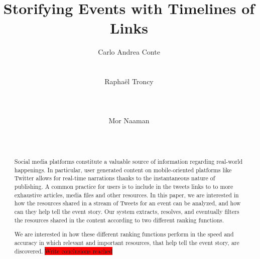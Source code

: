 \documentclass{sig-alternate}
\newcommand{\todo}[1]{\colorbox{red}{#1}}
\begin{document}
\title{Storifying Events with Timelines of Links}

\author{
\alignauthor Carlo Andrea Conte\\
	\\
    \\
\alignauthor Rapha\"el Troncy\\
	\\
	\\
		\\
\alignauthor Mor Naaman\\
    \\
    \\
}

\maketitle


\begin{abstract}

Social media platforms constitute a valuable source of information regarding real-world happenings. In particular, user generated content on mobile-oriented platforms like Twitter allows for real-time narrations thanks to the instantaneous nature of publishing. A common practice for users is to include in the tweets links to to more exhaustive articles, media files and other resources. In this paper, we are interested in how the resources shared in a stream of Tweets for an event can be analyzed, and how can they help tell the event story. Our system extracts, resolves, and eventually filters the resources shared in the content according to two different ranking functions. 

We are interested in how these different ranking functions perform in the speed and accuracy in which relevant and important resources, that help tell the event story, are discovered. 
\todo{Write conclusions reached}


\end{abstract}
\end{document}
